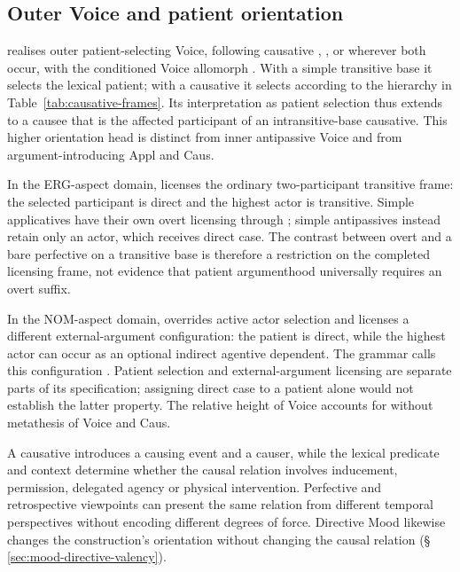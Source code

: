 \subsection{Outer Voice and patient orientation}
\label{sec:vm-n}

 realises outer patient-selecting Voice, following causative
, , or  wherever both occur,
with the conditioned Voice allomorph . With a simple transitive base it
selects the
lexical patient; with a causative it selects according to the hierarchy in
Table~\ref{tab:causative-frames}. Its interpretation as patient selection thus
extends to a causee that is the affected participant of an intransitive-base
causative. This higher orientation head is distinct from inner antipassive
Voice and from argument-introducing Appl and Caus.

In the ERG-aspect domain,  licenses the ordinary two-participant
transitive frame: the selected participant is direct and the highest actor is
transitive. Simple applicatives have their own overt licensing through
; simple antipassives instead retain only an actor, which receives
direct case. The contrast between overt  and a bare perfective on a
transitive base is therefore a restriction on the completed licensing frame,
not evidence that patient argumenthood universally requires an overt suffix.

In the NOM-aspect domain,  overrides active actor selection and
licenses a different external-argument configuration: the patient is direct,
while the highest actor can occur as an optional indirect agentive dependent.
The grammar calls this configuration . Patient selection and
external-argument licensing are separate parts of its specification; assigning
direct case to a patient alone would not establish the latter property.
The relative height of Voice accounts for  without
metathesis of Voice and Caus.

A causative introduces a causing event and a causer, while the lexical predicate
and context determine whether the causal relation involves inducement,
permission, delegated agency or physical intervention. Perfective and
retrospective viewpoints can present the same relation from different temporal
perspectives without encoding different degrees of force. Directive Mood
likewise changes the construction's orientation without changing the causal
relation (§\,\ref{sec:mood-directive-valency}).
